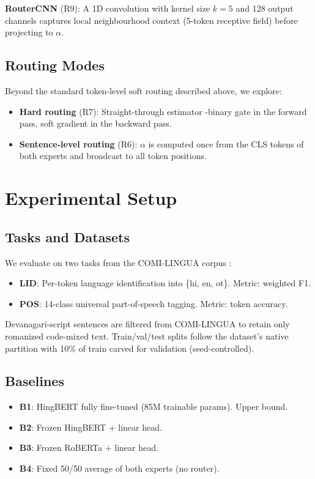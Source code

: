 \documentclass[conference]{IEEEtran}
\begin{document}
\textbf{RouterCNN} (R9): A 1D convolution with kernel size $k=5$ and 128 output channels captures local neighbourhood context (5-token receptive field) before projecting to $\alpha$.

\subsection{Routing Modes}

Beyond the standard token-level soft routing described above, we explore:
\begin{itemize}
    \item \textbf{Hard routing} (R7): Straight-through estimator \cite{bengio2013ste}-binary gate in the forward pass, soft gradient in the backward pass.
    \item \textbf{Sentence-level routing} (R6): $\alpha$ is computed once from the CLS tokens of both experts and broadcast to all token positions.
\end{itemize}

\section{Experimental Setup}

\subsection{Tasks and Datasets}

We evaluate on two tasks from the COMI-LINGUA corpus \cite{sheth2024comilingua}:
\begin{itemize}
    \item \textbf{LID}: Per-token language identification into \{hi, en, ot\}. Metric: weighted F1.
    \item \textbf{POS}: 14-class universal part-of-speech tagging. Metric: token accuracy.
\end{itemize}
Devanagari-script sentences are filtered from COMI-LINGUA to retain only romanized code-mixed text. Train/val/test splits follow the dataset's native partition with 10\% of train carved for validation (seed-controlled).

\subsection{Baselines}

\begin{itemize}
    \item \textbf{B1}: HingBERT fully fine-tuned (85M trainable params). Upper bound.
    \item \textbf{B2}: Frozen HingBERT + linear head.
    \item \textbf{B3}: Frozen RoBERTa + linear head.
    \item \textbf{B4}: Fixed 50/50 average of both experts (no router).
\end{itemize}
\end{document}
